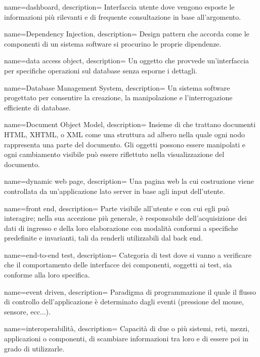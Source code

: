  {
name=dashboard,
description={
Interfaccia utente dove vengono esposte le informazioni più rilevanti e di
frequente consultazione in base all'argomento.
}
}

 {
name=Dependency Injection,
description={
Design pattern che accorda come le componenti di un sistema software si
procurino le proprie dipendenze.
}
}

 {
name=data access object,
description={
Un oggetto che provvede un'interfaccia per specifiche operazioni sul database
senza esporne i dettagli.
}
}

 {
name=Database Management System,
description={
Un sistema software progettato per consentire la creazione, la manipolazione
e l'interrogazione efficiente di database.
}
}

 {
name=Document Object Model,
description={
Insieme di  che trattano documenti HTML, XHTML, o XML come una
struttura ad albero nella quale ogni nodo rappresenta una parte del documento.
Gli oggetti possono essere manipolati e ogni cambiamento visibile può essere
riflettuto nella visualizzazione del documento.
}
}

 {
name=dynamic web page,
description={
Una pagina web la cui costruzione viene controllata da un'applicazione lato
server in base agli input dell'utente.
}
}

 {
name=front end,
description={
Parte visibile all’utente e con cui egli può interagire; nella sua accezione più
generale, è responsabile dell’acquisizione dei dati di ingresso e della loro
elaborazione con modalità conformi a specifiche predefinite e invarianti, tali
da renderli utilizzabili dal back end.
}
}

 {
name=end-to-end test,
description={
Categoria di test dove si vanno a verificare che il comportamento delle
interfacce dei componenti, soggetti ai test, sia conforme alla loro specifica.
}
}

 {
name=event driven,
description={
Paradigma di programmazione il quale il flusso di controllo dell'applicazione è
determinato dagli eventi (pressione del mouse, sensore, ecc...).
}
}

 {
name=interoperabilità,
description={
Capacità di due o più sistemi, reti, mezzi, applicazioni o componenti, di
scambiare informazioni tra loro e di essere poi in grado di utilizzarle.
}
}


